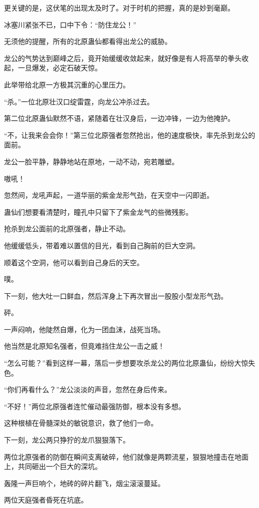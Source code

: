 \begin{this_body}
更关键的是，这伏笔的出现太及时了。对于时机的把握，真的是妙到毫巅。

冰塞川紧张不已，口中下令：“防住龙公！”

无须他的提醒，所有的北原蛊仙都看得出龙公的威胁。

龙公的气势达到巅峰之后，竟开始缓缓收敛起来，就好像是有人将高举的拳头收起，一旦爆发，必定石破天惊。

此举带给北原一方极其沉重的心里压力。

“杀。”一位北原壮汉口绽雷霆，向龙公冲杀过去。

第二位北原蛊仙默然不语，紧随着在壮汉身后，一边冲锋，一边为他掩护。

“不，让我来会会你！”第三位北原强者忽然抢出，他的速度极快，率先杀到龙公的面前。

龙公一脸平静，静静地站在原地，一动不动，宛若雕塑。

嗷吼！

忽然间，龙吼声起，一道华丽的紫金龙形气劲，在天空中一闪即逝。

蛊仙们想要看清楚时，瞳孔中只留下了紫金龙气的些微残影。

抢杀到龙公面前的北原强者，静止不动。

他缓缓低头，带着难以置信的目光，看到自己胸前的巨大空洞。

顺着这个空洞，他可以看到自己身后的天空。

噗。

下一刻，他大吐一口鲜血，然后浑身上下再次冒出一股股小型龙形气劲。

砰。

一声闷响，他陡然自爆，化为一团血沫，战死当场。

他当然是北原知名强者，但竟难挡住龙公一击之威！

“怎么可能？”看到这样一幕，落后一步想要攻杀龙公的两位北原蛊仙，纷纷大惊失色。

“你们再看什么？”龙公淡淡的声音，忽然在身后传来。

“不好！”两位北原强者连忙催动最强防御，根本没有多想。

这种根植在骨髓深处的敏锐意识，救了他们一命。

下一刻，龙公两只狰狞的龙爪狠狠落下。

两位北原强者的防御在瞬间支离破碎，他们就像是两颗流星，狠狠地撞击在地面上，共同砸出一个巨大的深坑。

轰隆一声巨响个，地砖的碎片翻飞，烟尘滚滚蔓延。

两位天庭强者昏死在坑底。


\end{this_body}
